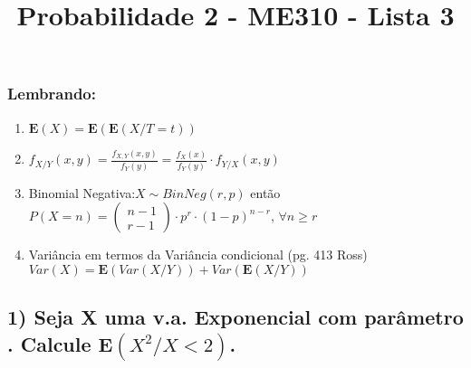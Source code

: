 \documentclass[english]{article}
\DeclareRobustCommand{\greektext}{%
  \fontencoding{LGR}\selectfont\def\encodingdefault{LGR}}
\DeclareRobustCommand{\textgreek}[1]{\leavevmode{\greektext #1}}
\begin{document}
\title{Probabilidade 2 - ME310 - Lista 3}

\maketitle

\subsubsection*{Lembrando:}
\begin{enumerate}
\item $\mathbf{E}(X)=\mathbf{E}(\mathbf{E}(X/T=t))$
\item $f_{X/Y}(x,y)=\frac{f_{X,Y}(x,y)}{f_{Y}(y)}=\frac{f_{X}(x)}{f_{Y}(y)}\cdot f_{Y/X}(x,y)$
\item Binomial Negativa:$X\sim BinNeg(r,p)$ então $P(X=n)=\left(\begin{array}{c}
n-1\\
r-1
\end{array}\right)\cdot p^{r}\cdot(1-p)^{n-r}$, $\forall n\ge r$
\item Variância em termos da Variância condicional (pg. 413 Ross) $Var(X)=\mathbf{E}(Var(X/Y))+Var(\mathbf{E}(X/Y))$
\end{enumerate}
\pagebreak{}


\subsection*{\textmd{1) Seja X uma v.a. Exponencial com parâmetro \textgreek{l}.
Calcule $\mathbf{E}(X^{2}/X<2)$.}}
\end{document}
